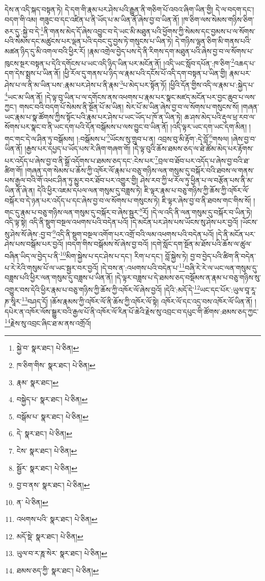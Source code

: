 དེས་ན་འདི་སྐད་བསྟན་ཏེ། དེ་དག་གི་རྣམ་པར་ཤེས་པའི་རྒྱུན་ནི་གཅིག་པོ་འབའ་ཞིག་ཡིན་གྱི། དེ་ལ་བདག་དང་། བདག་གི་འམ། གཟུང་བ་དང་འཛིན་པ་ནི་ཡོད་པ་མ་ཡིན་ནོ་ཞེས་བྱ་བ་ཡིན་ནོ། །ཁ་ཅིག་ལས་སེམས་གཉིས་ཅིག་ཅར་དུ་:སྐྱེ་བ་དེ་\footnote{སྐྱེ་བ་  སྣར་ཐང་།  པེ་ཅིན། }ནི་གནས་མེད་དོ་ཞེས་འབྱུང་བ་དེ་ཡང་མི་མཐུན་པའི་ཕྱོགས་ཀྱི་སེམས་དང་བྱམས་པ་ལ་སོགས་པའི་སེམས་དང་མཚུངས་པར་ལྡན་པའི་དབང་དུ་བྱས་ཏེ་གསུངས་པ་ཡིན་ཏེ། དེ་གཉིས་ལྷན་ཅིག་མི་གནས་པའི་མཚན་ཉིད་དུ་མི་འགལ་བའི་ཕྱིར་རོ། །རྣམ་འགྲེལ་བྱེད་པས་དེ་ནི་རིགས་དག་མཐུན་པའི་ཞེས་བྱ་བ་ལ་སོགས་པ་ཁུངས་སྔར་བསྟན་པ་དེའི་དགོངས་པ་ཡང་འདི་ཉིད་ཡིན་པར་མངོན་ནོ། །འདི་ཡང་སློབ་དཔོན་:ཁ་ཅིག་\footnote{ཁ་ཅིག་གིས་  སྣར་ཐང་།  པེ་ཅིན། }འཆད་པ་དག་དེས་སྨྲས་པ་ཡིན་ནོ། །ཕྱི་རོལ་དུ་གནས་པ་ཉིད་ལ་རྣམ་པའི་དངོས་པོ་འདི་དག་བསྟན་པ་ཡིན་གྱི། རྣམ་པར་ཤེས་པ་ལ་ནི་མ་ཡིན་པས་:རྣམ་པར་ཤེས་པ་ནི་རྣམ་\footnote{རྣམ་  སྣར་ཐང་། }པ་མེད་པར་སྟོན་ཏོ། །ཕྱིའི་དོན་གྱིས་འདི་ལ་རྣམ་པ་:སྐྱེད་པ་\footnote{བསྐྱེད་པ་  སྣར་ཐང་།  པེ་ཅིན། }ཡང་མ་ཡིན་ནོ། །དེ་ལྟ་བུ་ཡིན་པ་ལ་དགོངས་ནས་འཕགས་པ་རྣམ་པར་སྣང་མཛད་མངོན་པར་བྱང་ཆུབ་པ་ལས་ཀྱང་། གསང་བའི་བདག་པོ་སེམས་ནི་སྔོན་པོ་མ་ཡིན། སེར་པོ་མ་ཡིན་ཞེས་བྱ་བ་ལ་སོགས་པ་གསུངས་སོ། །གཞན་ཡང་རྣམ་པ་སྣ་ཚོགས་ཀྱིས་སྟོང་པའི་རྣམ་པར་ཤེས་པ་ཡང་ཡོད་པ་ཁོ་ན་ཡིན་ཏེ། ཆ་ཤས་མེད་པའི་རྡུལ་ཕྲ་རབ་ལ་སོགས་པར་སྣང་བ་ནི་ཡང་དག་པའི་དོན་བསྒོམས་པ་ལས་བྱུང་བ་ཡིན་ནོ། །འདི་ལྟར་ཡང་དག་ཡང་དག་མིན། །གང་གང་དེ་ལ་ཤིན་ཏུ་བསྒོམས། །:བསྒོམས་པ་\footnote{བསྒོམ་པ་  སྣར་ཐང་།  པེ་ཅིན། }ཡོངས་སུ་གྲུབ་པ་ན། འབྲས་བུ་མི་རྟོག་:དེ་བློ་\footnote{དེ་  སྣར་ཐང་།  པེ་ཅིན། }གསལ། །ཞེས་བྱ་བ་ཡིན་ནོ། །རྒྱས་པར་དཔྱད་པ་ཡོད་པས་རེ་ཞིག་གཞག་གོ། །དེ་ལྟ་བུའི་ཆོས་ཐམས་ཅད་ལ་ཐེ་ཚོམ་མེད་པར་རྟོགས་པར་འདོད་པ་ཞེས་བྱ་བ་ནི་སྒྲོ་འདོགས་པ་ཐམས་ཅད་དང་:ངེས་པར་\footnote{ངེས་  སྣར་ཐང་།  པེ་ཅིན། }བྲལ་བ་ཐོབ་པར་འདོད་པ་ཞེས་བྱ་བའི་ཐ་ཚིག་གོ། །གཞན་དག་སེམས་པ་ཆོས་ཀྱི་འཁོར་ལོ་རྣམ་པ་བཅུ་གཉིས་ལན་གསུམ་དུ་བསྐོར་བའི་ཐབས་ལ་གནས་པས་རྒྱལ་བའི་གོ་འཕང་ཤིན་ཏུ་མྱུར་བར་ཐོབ་པར་འགྱུར་གྱི། ཤེས་རབ་ཀྱི་ཕ་རོལ་ཏུ་ཕྱིན་པ་ལ་བརྩོན་པས་ནི་མ་ཡིན་ནོ་ཞེ་ན། དེའི་ཕྱིར་འཇམ་དཔལ་ལན་གསུམ་དུ་བཟླས་ཏེ། ཇི་ལྟར་རྣམ་པ་བཅུ་གཉིས་ཀྱི་ཆོས་ཀྱི་འཁོར་ལོ་བསྐོར་བ་དེ་ཉན་པར་འདོད་པ་དང་ཞེས་བྱ་བ་ལ་སོགས་པ་གསུངས་ཏེ། ཇི་ལྟར་ཞེས་བྱ་བ་ནི་ཐབས་གང་གིས་སོ། །གང་དུ་རྣམ་པ་བཅུ་གཉིས་ལན་གསུམ་དུ་བསྐོར་བ་ཞེས་སྦྱར་\footnote{སྦྱོར་  སྣར་ཐང་།  པེ་ཅིན། }རོ། །དེ་ལ་འདི་ནི་ལན་གསུམ་དུ་བསྐོར་བ་ཡིན་ཏེ། འདི་ལྟ་སྟེ། འདི་ནི་སྡུག་བསྔལ་འཕགས་པའི་བདེན་པའོ། །དེ་མངོན་པར་ཤེས་པས་ཡོངས་སུ་ཤེས་པར་བྱའོ། །ཡོངས་སུ་ཤེས་སོ་ཞེས་:བྱ་བ་\footnote{བྱ་བ་ནས་  སྣར་ཐང་།  པེ་ཅིན། }འདི་ནི་སྡུག་བསྔལ་འགོག་པར་འགྲོ་བའི་ལམ་འཕགས་པའི་བདེན་པའོ། །དེ་ནི་མངོན་པར་ཤེས་པས་བསྒོམ་པར་བྱའོ། །བདག་གིས་བསྒོམས་སོ་ཞེས་བྱ་བའོ། །དགེ་སློང་དག་སྔོན་མ་ཐོས་པའི་ཆོས་ལ་ཚུལ་བཞིན་ཡིད་ལ་བྱེད་པ་ནི་\footnote{ན་  པེ་ཅིན། }མིག་སྐྱེས་པ་དང་ཤེས་པ་དང་། རིག་པ་དང་། བློ་སྐྱེས་ཏེ། བྱ་བ་བྱེད་པའི་ཚིག་ནི་བདེན་པ་རེ་རེའི་གསུམ་པོ་ལ་ཡང་སྦྱར་བར་བྱའོ། །དེ་བས་ན་:འཕགས་པའི་བདེན་པ་\footnote{འཕགས་པའི་  སྣར་ཐང་།  པེ་ཅིན། }བཞི་རེ་རེ་ལ་ཡང་ལན་གསུམ་དུ་བཟླས་པའི་ཕྱིར་ལན་གསུམ་དུ་བཟླས་པ་ཡིན་ནོ། །དེ་ལྟར་བཟླས་པ་དེ་ཐམས་ཅད་བསྡོམས་ན་རྣམ་པ་བཅུ་གཉིས་སུ་འགྱུར་བས་དེའི་ཕྱིར་རྣམ་པ་བཅུ་གཉིས་ཀྱི་ཆོས་ཀྱི་འཁོར་ལོ་ཞེས་བྱའོ། །དེའི་:མདོ་དེ་\footnote{མདོ་སྡེ་  སྣར་ཐང་།  པེ་ཅིན། }ཡང་དང་པོར་:ཡུལ་བཱ་རཱ་ཎ་སཱིར་\footnote{ཡུལ་བ་ར་ཎཱ་སེར་  སྣར་ཐང་།  པེ་ཅིན། }བཤད་དོ། །ཆོས་རྣམས་ཀྱི་འཁོར་ལོ་ནི་ཆོས་ཀྱི་འཁོར་ལོ་སྟེ། འཁོར་ལོ་དང་འདྲ་བས་འཁོར་ལོ་ཡིན་ནོ། །དཔེར་ན་འཁོར་ལོས་སྒྱུར་བའི་རྒྱལ་པོ་ནི་འཁོར་ལོ་རིན་པོ་ཆེའི་རྗེས་སུ་འབྲང་བ་དཔུང་གི་ཚོགས་:ཐམས་ཅད་ཀྱང་\footnote{ཐམས་ཅད་ཀྱི་  སྣར་ཐང་།  པེ་ཅིན། }རྗེས་སུ་འབྲང་ཞིང་ཐ་མ་ནས་འགྲོའོ། 